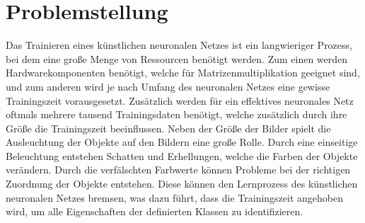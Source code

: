 \documentclass[a4paper,12pt,oneside]{article}
\begin{document}
  \newpage
  \pagestyle{plain}
  \setcounter{page}{1}
  
  \tableofcontents
  
  \newpage
  
  \section{Problemstellung}
  Das Trainieren eines künstlichen neuronalen Netzes ist ein langwieriger Prozess, bei dem 
  eine große Menge von Ressourcen benötigt werden. Zum einen werden Hardwarekomponenten benötigt, 
  welche für Matrizenmultiplikation geeignet sind, und zum anderen wird je nach Umfang des 
  neuronalen Netzes eine gewisse Trainingszeit vorausgesetzt. Zusätzlich werden für ein 
  effektives neuronales Netz oftmals mehrere tausend Trainingsdaten benötigt, welche zusätzlich 
  durch ihre Größe die Trainingszeit beeinflussen. Neben der Größe der Bilder spielt die  
  Ausleuchtung der Objekte auf den Bildern eine große Rolle. Durch eine einseitige Beleuchtung 
  entstehen Schatten und Erhellungen, welche die Farben der Objekte verändern. Durch 
  die verfälschten Farbwerte können Probleme bei der richtigen Zuordnung der Objekte entstehen. 
  Diese können den Lernprozess des künstlichen neuronalen Netzes bremsen, was dazu führt, dass die 
  Trainingszeit angehoben wird, um alle Eigenschaften der definierten Klassen zu identifizieren.
  \vspace{1 cm}
\end{document}
